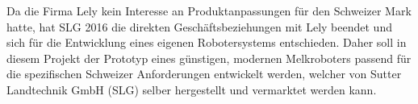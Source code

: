Da die Firma Lely kein Interesse an Produktanpassungen für den Schweizer Mark hatte, hat SLG 2016 die direkten Geschäftsbeziehungen mit Lely beendet und sich für die Entwicklung eines eigenen Robotersystems entschieden. Daher soll in diesem Projekt der Prototyp eines günstigen, modernen Melkroboters passend für die spezifischen Schweizer Anforderungen entwickelt werden, welcher von Sutter Landtechnik GmbH (SLG) selber hergestellt und vermarktet werden kann.


